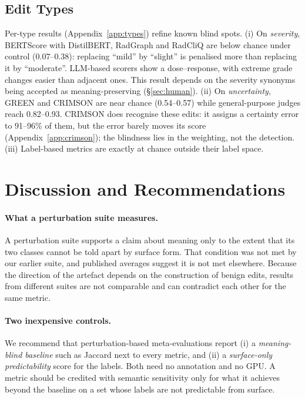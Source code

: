 \documentclass[11pt]{article}
\begin{document}
\subsection{Edit Types}

Per-type results (Appendix~\ref{app:types}) refine known blind spots. (i) On \emph{severity}, BERTScore with DistilBERT, RadGraph and RadCliQ are below chance under control (0.07--0.38): replacing ``mild'' by ``slight'' is penalised more than replacing it by ``moderate''. LLM-based scorers show a dose--response, with extreme grade changes easier than adjacent ones. This result depends on the severity synonyms being accepted as meaning-preserving (\S\ref{sec:human}). (ii) On \emph{uncertainty}, GREEN and CRIMSON are near chance (0.54--0.57) while general-purpose judges reach 0.82--0.93. CRIMSON does recognise these edits: it assigns a certainty error to 91--96\% of them, but the error barely moves its score (Appendix~\ref{app:crimson}); the blindness lies in the weighting, not the detection. (iii) Label-based metrics are exactly at chance outside their label space.

\section{Discussion and Recommendations}

\paragraph{What a perturbation suite measures.}
A perturbation suite supports a claim about meaning only to the extent that its two classes cannot be told apart by surface form. That condition was not met by our earlier suite, and published averages suggest it is not met elsewhere. Because the direction of the artefact depends on the construction of benign edits, results from different suites are not comparable and can contradict each other for the same metric.

\paragraph{Two inexpensive controls.}
We recommend that perturbation-based meta-evaluations report (i) a \emph{meaning-blind baseline} such as Jaccard next to every metric, and (ii) a \emph{surface-only predictability} score for the labels. Both need no annotation and no GPU. A metric should be credited with semantic sensitivity only for what it achieves beyond the baseline on a set whose labels are not predictable from surface.
\end{document}
